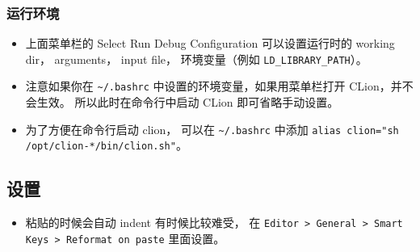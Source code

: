 \subsubsection{运行环境}
\begin{itemize}
\item 上面菜单栏的 Select Run Debug Configuration 可以设置运行时的 working dir， arguments， input file， 环境变量（例如 \verb|LD_LIBRARY_PATH|）。
\item 注意如果你在 \verb|~/.bashrc| 中设置的环境变量，如果用菜单栏打开 CLion，并不会生效。 所以此时在命令行中启动 CLion 即可省略手动设置。
\item 为了方便在命令行启动 clion， 可以在 \verb|~/.bashrc| 中添加 \verb|alias clion="sh /opt/clion-*/bin/clion.sh"|。
\end{itemize}

\subsection{设置}
\begin{itemize}
\item 粘贴的时候会自动 indent 有时候比较难受， 在 \verb|Editor > General > Smart Keys > Reformat on paste| 里面设置。
\end{itemize}
